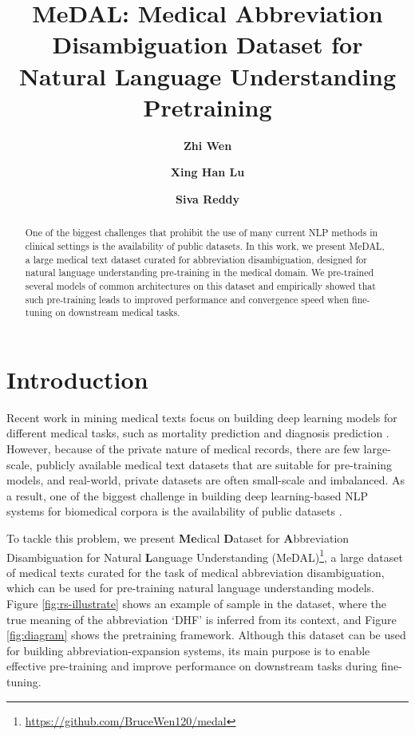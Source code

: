 \documentclass[11pt,a4paper]{article}
\title{MeDAL: Medical Abbreviation Disambiguation Dataset for Natural Language Understanding Pretraining}
\author[1]{\textbf{Zhi Wen}}
\author[1]{\textbf{Xing Han Lu}}
\author[1,2,3]{\textbf{Siva Reddy}}
\affil[1]{McGill University}
\affil[2]{Facebook CIFAR AI Chair}
\affil[3]{Mila -- Quebec Artificial Intelligence Institute}
\affil[ ]{\texttt {\{zhi.wen,xing.han.lu\}@mail.mcgill.ca}}
\affil[ ]{\texttt {siva@cs.mcgill.ca}}
\date{}
\begin{document}
\maketitle
\begin{abstract}
One of the biggest challenges that prohibit the use of many current NLP methods in clinical settings is the availability of public datasets. In this work, we present MeDAL, a large medical text dataset curated for abbreviation disambiguation, designed for natural language understanding pre-training in the medical domain. We pre-trained several models of common architectures on this dataset and empirically showed that such pre-training leads to improved performance and convergence speed when fine-tuning on downstream medical tasks.

\end{abstract}

\section{Introduction}

Recent work in mining medical texts focus on building deep learning models for different medical tasks, such as mortality prediction \citep{Grnarova2016NeuralPrediction} and diagnosis prediction \citep{Li2020InferringRecords}. However, because of the private nature of medical records, there are few large-scale, publicly available medical text datasets that are suitable for pre-training models, and real-world, private datasets are often small-scale and imbalanced. As a result, one of the biggest challenge in building deep learning-based NLP systems for biomedical corpora is the availability of public datasets \cite{Wang2018ClinicalReview}.

To tackle this problem, we present \textbf{Me}dical \textbf{D}ataset for \textbf{A}bbreviation Disambiguation for Natural \textbf{L}anguage Understanding (MeDAL)\footnote{\href{https://github.com/BruceWen120/medal}{https://github.com/BruceWen120/medal}}, a large dataset of medical texts curated for the task of medical abbreviation disambiguation, which can be used for pre-training natural language understanding models. Figure \ref{fig:rs-illustrate} shows an example of sample in the dataset, where the true meaning of the abbreviation `DHF' is inferred from its context, and Figure \ref{fig:diagram} shows the pretraining framework. Although this dataset can be used for building abbreviation-expansion systems, its main purpose is to enable effective pre-training and improve performance on downstream tasks during fine-tuning.
\end{document}
